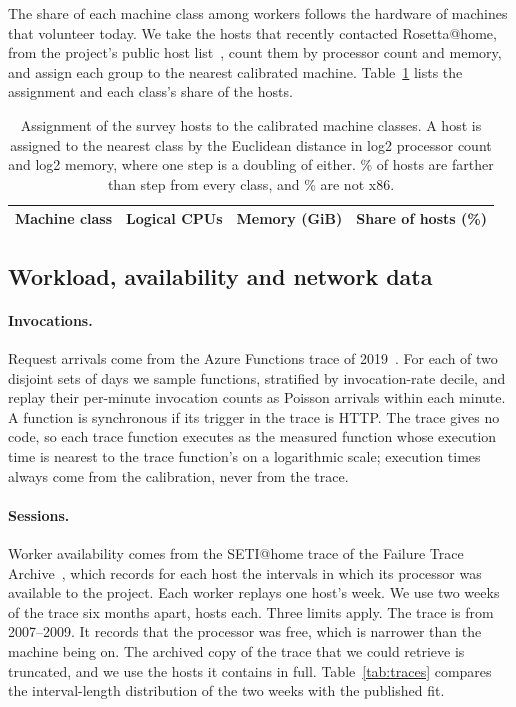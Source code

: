 The share of each machine class among workers follows the hardware of machines that volunteer today. We take the
\VBoincRosettaActive{} hosts that recently contacted Rosetta@home, from the project's public host
list~\cite{boincstats}, count them by processor count and memory, and assign each group to the nearest calibrated
machine. Table~\ref{tab:fleet} lists the assignment and each class's share of the hosts.

\begin{table}[t]
\caption{Assignment of the survey hosts to the calibrated machine classes. A host is assigned to the nearest class by
the Euclidean distance in log2 processor count and log2 memory, where one step is a doubling of either.
\VFleetUnrepresentedPct\% of hosts are farther than \VFleetRadius{} step from every class, and \VFleetNonXPct\% are
not x86.}
\label{tab:fleet}
\small
\begin{tabular}{@{}lrrr@{}}
\toprule
Machine class & Logical CPUs & Memory (GiB) & Share of hosts (\%) \\
\midrule

\end{tabular}
\end{table}

\subsection{Workload, availability and network data}
\label{sec:traces}

\paragraph{Invocations.} Request arrivals come from the Azure Functions trace of 2019~\cite{shahrad2020wild}. For
each of two disjoint sets of days we sample \VAzureFnPerSplit{} functions, stratified by invocation-rate decile, and
replay their per-minute invocation counts as Poisson arrivals within each minute. A function is synchronous if its
trigger in the trace is HTTP. The trace gives no code, so each trace function executes as the measured function whose
execution time is nearest to the trace function's on a logarithmic scale; execution times always come from the
calibration, never from the trace.

\paragraph{Sessions.} Worker availability comes from the SETI@home trace of the Failure Trace
Archive~\cite{javadi2013fta,javadi2009seti}, which records for each host the intervals in which its processor was
available to the project. Each worker replays one host's week. We use two weeks of the trace six months apart,
\VSetiHostsPerSplit{} hosts each. Three limits apply. The trace is from 2007--2009. It records that the processor was
free, which is narrower than the machine being on. The archived copy of the trace that we could retrieve is truncated,
and we use the hosts it contains in full. Table~\ref{tab:traces} compares the interval-length distribution of the
two weeks with the published fit.

